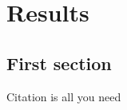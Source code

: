 \chapter{Results}
\label{chapter:Results}

\section{First section}

Citation is all you need~\cite{Vaswani2017}